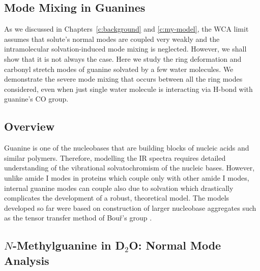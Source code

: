\documentclass[a4paper,titlepage,twoside,fleqn,12pt]{book}
\begin{document}
\begin{refsection}
\chapter{Mode Mixing in Guanines\label{c:mode-mixing-guanines}}

As we discussed in Chapters~\ref{c:background} and \ref{c:my-model}, 
the WCA limit assumes
that solute's normal modes are coupled very weakly and the intramolecular
solvation\hyp{}induced mode mixing is neglected. However, we shall
show that it is not always the case. Here we study the ring deformation
and carbonyl stretch modes of guanine solvated by a few water
molecules. We demonstrate the severe mode mixing that occurs
between all the ring modes considered, even when just single water molecule
is interacting via H-bond with guanine's CO group. 

\section{Overview}

Guanine is one of the nucleobases that are building blocks of
nucleic acids and similar polymers. \citep{Limongelli.DeTito.Cerofolini.Fragai.Pagano.Trotta.Cosconati.Marinelli.Novellino.Bertini.Randazzo.Luchinat.Parrinello.Angew.2013,
Peng.Jones.Tokmakoff.JACS.2011} Therefore, modelling the
IR spectra requires detailed understanding of the vibrational
solvatochromism of the nucleic bases. However, unlike amide I modes
in proteins which couple only with other amide I modes, 
internal guanine modes can couple also due to solvation
which drastically complicates the development of a robust, 
theoretical model. The models developed so far were based
on construction of larger nucleobase aggregates such as
the tensor transfer method of Bou\v{r}'s group \citep{Bour.Sopkova.Bednarova.Malon.Keiderling.JCC.1997,
Andrushchenko.Tsankov.Krasteva.Wieser.Bour.JACS.2011}.

\section{$N$-Methylguanine in D$_2$O: Normal Mode Analysis}


\end{refsection}
\end{document}
